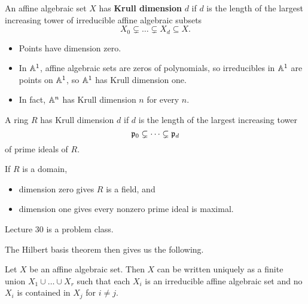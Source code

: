 \pagebreak

\begin{definition}
An affine algebraic set $ X $ has \textbf{Krull dimension} $ d $ if $ d $ is the length of the largest increasing tower of irreducible affine algebraic subsets
$$ X_0 \subsetneq \dots \subsetneq X_d \subseteq X. $$
\end{definition}

\begin{example*}
\hfill
\begin{itemize}
\item Points have dimension zero.
\item In $ \mathbb{A}^1 $, affine algebraic sets are zeros of polynomials, so irreducibles in $ \mathbb{A}^1 $ are points on $ \mathbb{A}^1 $, so $ \mathbb{A}^1 $ has Krull dimension one.
\item In fact, $ \mathbb{A}^n $ has Krull dimension $ n $ for every $ n $.
\end{itemize}
\end{example*}

\begin{definition}
A ring $ R $ has Krull dimension $ d $ if $ d $ is the length of the largest increasing tower
$$ \mathfrak{p}_0 \subsetneq \dots \subsetneq \mathfrak{p}_d $$
of prime ideals of $ R $.
\end{definition}

\begin{example*}
If $ R $ is a domain,
\begin{itemize}
\item dimension zero gives $ R $ is a field, and
\item dimension one gives every nonzero prime ideal is maximal.
\end{itemize}
\end{example*}


Lecture 30 is a problem class.

The Hilbert basis theorem then gives us the following.

\begin{proposition}
Let $ X $ be an affine algebraic set. Then $ X $ can be written uniquely as a finite union $ X_1 \cup \dots \cup X_r $ such that each $ X_i $ is an irreducible affine algebraic set and no $ X_i $ is contained in $ X_j $ for $ i \ne j $.
\end{proposition}

